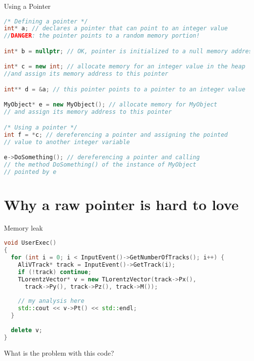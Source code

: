 \documentclass[xcolor={usenames,dvipsnames}]{beamer}
\begin{document}
\begin{frame}[fragile]{Using a Pointer}
\scriptsize
\begin{lstlisting}[language=C++]
/* Defining a pointer */
int* a; // declares a pointer that can point to an integer value
//DANGER: the pointer points to a random memory portion!

int* b = nullptr; // OK, pointer is initialized to a null memory address

int* c = new int; // allocate memory for an integer value in the heap 
//and assign its memory address to this pointer

int** d = &a; // this pointer points to a pointer to an integer value

MyObject* e = new MyObject(); // allocate memory for MyObject
// and assign its memory address to this pointer

/* Using a pointer */
int f = *c; // dereferencing a pointer and assigning the pointed
// value to another integer variable

e->DoSomething(); // dereferencing a pointer and calling
// the method DoSomething() of the instance of MyObject
// pointed by e
\end{lstlisting}
\end{frame}

\section{Why a raw pointer is hard to love}

\begin{frame}[fragile]{Memory leak}
\scriptsize
\begin{lstlisting}[language=C++]
void UserExec()
{
  for (int i = 0; i < InputEvent()->GetNumberOfTracks(); i++) {
    AliVTrack* track = InputEvent()->GetTrack(i);
    if (!track) continue;
    TLorentzVector* v = new TLorentzVector(track->Px(), 
      track->Py(), track->Pz(), track->M());
    
    // my analysis here
    std::cout << v->Pt() << std::endl;
  }
  
  delete v;
}
\end{lstlisting}
\small 
\begin{center}
What is the problem with this code?
\end{center}
\end{frame}
\end{document}
